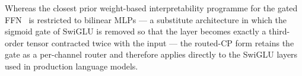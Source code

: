 %

Whereas the closest prior weight-based interpretability programme for the
gated FFN~\citep{pearce2024bilinear} is restricted to bilinear MLPs --- a
substitute architecture in which the sigmoid gate of SwiGLU is removed so
that the layer becomes exactly a third-order tensor contracted twice with
the input --- the routed-CP form retains the gate as a per-channel router
and therefore applies directly to the SwiGLU layers used in production
language models.


